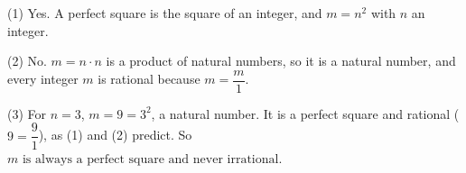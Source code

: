(1) Yes. A perfect square is the square of an integer, and $m=n^2$ with $n$ an integer.

(2) No. $m=n\cdot n$ is a product of natural numbers, so it is a natural number, and every integer $m$ is rational because $m=\dfrac {m}{1}$.

(3) For $n=3$, $m=9=3^2$, a natural number. It is a perfect square and rational ($9=\dfrac{9}{1}$), as (1) and (2) predict. So $\boxed{m\text{ is always a perfect square and never irrational}}$.
